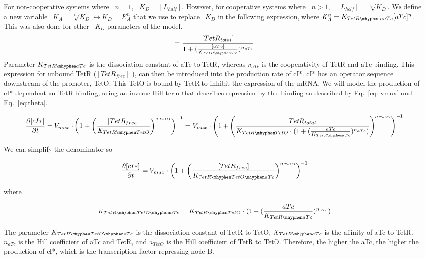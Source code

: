 For non-cooperative systems where ~$n=1$, ~$K_{D}=[L_{half}]$.
However, for cooperative systems where ~$n>1$, ~$[L_{half}] = \sqrt[n]{K_{D}}$.
We define a new variable ~$K_{A} = \sqrt[n]{K_{D}} \leftrightarrow K_{D} = K^n_{A}$
that we use to replace ~$K_{D}$ in the following expression,
where $K^n_{A} = K_{TetR \mhyphen naTc}{[aTc]^n}$.
This was also done for other ~$K_{D}$ parameters of the model.
\begin{equation}
[TetR_{free}] =  \frac{[TetR_{total}]}{1+(\frac{[aTc]}{K_{TetR \mhyphen aTc}})^{n_{aTc}}}
\end{equation}
Parameter $K_{TetR \mhyphen aTc}$ is the dissociation constant of aTc to TetR,
whereas $n_{aTc}$ is the cooperativity of TetR and aTc binding.
This expression for unbound TetR ($[TetR_{free}]$ ), can then be introduced into the production rate of cI*.
cI* has an operator sequence downstream of the promoter, TetO.
This TetO is bound by TetR to inhibit the expression of the mRNA.
We will model the production of cI* dependent on TetR binding,
using an inverse-Hill term
that describes repression by this binding as described by Eq.~\ref{eq: vmax} and Eq.~\ref{eq:theta}.

\begin{equation}
    \pdv{[cI*]}{t} = V_{max}\cdot \left(1+\left(\frac{[TetR_{free}]}{K_{TetR \mhyphen TetO}}\right)^{n_{TetO}}\right)^{-1} = V_{max} \cdot \left(1+\left(\frac{TetR_{total}}{K_{TetR \mhyphen TetO}\cdot(1+(\frac{aTc}{K_{TetR \mhyphen aTc}})^{n_{aTc}})}\right)^{n_{TetO}}\right)^{-1}
\end{equation}

We can simplify the denominator so

\begin{equation}
    \pdv{[cI*]}{t} = V_{max}\cdot \left(1+\left(\frac{[TetR_{free}]}{K_{TetR \mhyphen TetO \mhyphen aTc }}\right)^{n_{TetO}}\right)^{-1}
\end{equation}

where

\begin{equation}
    K_{TetR \mhyphen TetO \mhyphen aTc}=K_{TetR \mhyphen TetO}\cdot(1+(\frac{aTc}{K_{TetR \mhyphen aTc}})^{n_{aTc}})
\end{equation}

The parameter $K_{TetR \mhyphen TetO \mhyphen aTc}$ is the dissociation constant of TetR to TetO, $K_{TetR \mhyphen aTc}$
is the affinity of aTc to TetR, $n_{aTc}$ is the Hill coefficient of aTc and TetR,
and $n_{TetO}$ is the Hill coefficient of TetR to TetO.
Therefore, the higher the aTc, the higher the production of cI*, which is the transcription factor repressing node B.

